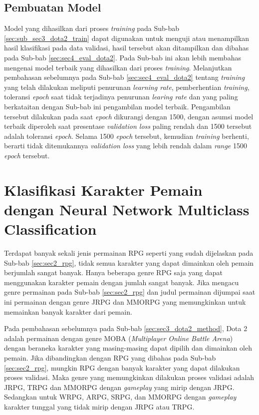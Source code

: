 \subsection{Pembuatan Model}
\label{sec:sub_sec3_dota2_model}
\vspace{1ex}

Model yang dihasilkan dari proses \textit{training} pada Sub-bab \ref{sec:sub_sec3_dota2_train} dapat digunakan untuk menguji atau menampilkan hasil klasifikasi pada data validasi, hasil tersebut akan ditampilkan dan dibahas pada Sub-bab \ref{sec:sec4_eval_dota2}. Pada Sub-bab ini akan lebih membahas mengenai model terbaik yang dihasilkan dari proses \textit{training}. Melanjutkan pembahasan sebelumnya pada Sub-bab \ref{sec:sec4_eval_dota2} tentang \textit{training} yang telah dilakukan meliputi penurunan \textit{learning rate}, pemberhentian \textit{training}, toleransi \textit{epoch} saat tidak terjadinya penurunan \textit{learing rate} dan yang paling berkataitan dengan Sub-bab ini pengambilan model terbaik. Pengambilan tersebut dilakukan pada saat \textit{epoch} dikurangi dengan 1500, dengan asumsi model terbaik diperoleh saat presentase \textit{validation loss} paling rendah dan 1500 tersebut adalah toleransi \textit{epoch}. Selama 1500 \textit{epoch} tersebut, kemudian \textit{training} berhenti, berarti tidak ditemukannya \textit{validation loss} yang lebih rendah dalam \textit{range} 1500 \textit{epoch} tersebut.
\vspace{1ex}

\section{Klasifikasi Karakter Pemain dengan Neural Network Multiclass Classification}
\label{sec:sec3_player_method}
\vspace{1ex}

Terdapat banyak sekali jenis permainan RPG seperti yang sudah dijelaskan pada Sub-bab \ref{sec:sec2_rpg}, tidak semua karakter yang dapat dimainkan oleh pemain berjumlah sangat banyak. Hanya beberapa genre RPG saja yang dapat menggunakan karakter pemain dengan jumlah sangat banyak. Jika mengacu genre permainan pada Sub-bab \ref{sec:sec2_rpg} dan judul permainan dijumpai saat ini permainan dengan genre JRPG dan MMORPG yang memungkinkan untuk memainkan banyak karakter dari pemain.
\vspace{1ex}

Pada pembahasan sebelumnya pada Sub-bab \ref{sec:sec3_dota2_method}, Dota 2 adalah permainan dengan genre MOBA (\textit{Multiplayer Online Battle Arena}) dengan beraneka karakter yang masing-masing dapat dipilih dan dimainkan oleh pemain. Jika dibandingkan dengan RPG yang dibahas pada Sub-bab \ref{sec:sec2_rpg}, mungkin RPG dengan banyak karakter yang dapat dilakukan proses validasi. Maka genre yang memungkinkan dilakukan proses validasi adalah JRPG, TRPG dan MMORPG dengan \textit{gameplay} yang mirip dengan JRPG. Sedangkan untuk WRPG, ARPG, SRPG, dan MMORPG dengan \textit{gameplay} karakter tunggal yang tidak mirip dengan JRPG atau TRPG.
\vspace{1ex}

